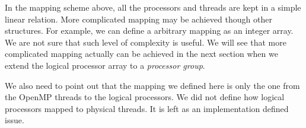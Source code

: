 In the mapping scheme above, all the processors and threads are kept in a
simple linear relation. More complicated mapping may be achieved though other
structures. For example, we can define a arbitrary mapping as an integer array.
We are not sure that such level of complexity is useful. We will see that more
complicated mapping actually can be achieved in the next section when we extend
the logical processor array to a \emph{processor group}.

We also need to point out that the mapping we defined here is only the one from
the OpenMP threads to the logical processors. We did not define how logical
processors mapped to physical threads. It is left as an implementation defined
issue. 










